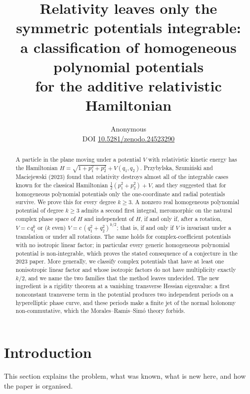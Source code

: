 \documentclass[11pt]{article}
\title{Relativity leaves only the symmetric potentials integrable:\\
a classification of homogeneous polynomial potentials\\
for the additive relativistic Hamiltonian}
\author{Anonymous\\[3pt]{\small DOI \href{https://doi.org/10.5281/zenodo.24523290}{10.5281/zenodo.24523290}}}
\date{}
\numberwithin{equation}{section}
\theoremstyle{definition}
\theoremstyle{remark}
\begin{document}
\maketitle

\begin{abstract}
A particle in the plane moving under a potential $V$ with relativistic kinetic energy has the Hamiltonian
$H=\sqrt{1+p_1^2+p_2^2}+V(q_1,q_2)$. Przybylska, Szumi\'nski and Maciejewski (2023) found that relativity destroys
almost all of the integrable cases known for the classical Hamiltonian $\tfrac12(p_1^2+p_2^2)+V$, and they
suggested that for homogeneous polynomial potentials only the one-coordinate and radial potentials survive.
We prove this for every degree $k\ge3$. A nonzero real homogeneous polynomial potential of degree $k\ge3$ admits a
second first integral, meromorphic on the natural complex phase space of $H$ and independent of $H$, if and only if,
after a rotation, $V=c\,q_1^k$ or ($k$ even) $V=c\,(q_1^2+q_2^2)^{k/2}$; that is, if and only if $V$ is invariant
under a translation or under all rotations. The same holds for complex-coefficient potentials with no isotropic
linear factor; in particular every generic homogeneous polynomial potential is non-integrable, which proves the stated consequence of a conjecture in the 2023 paper. More generally, we classify complex potentials that have at least one nonisotropic linear factor and whose isotropic factors do not have multiplicity exactly $k/2$, and we name the two families that the method leaves undecided. The new ingredient is a
rigidity theorem at a vanishing transverse Hessian eigenvalue: a first nonconstant transverse term in the potential
produces two independent periods on a hyperelliptic phase curve, and these periods make a finite jet of the normal
holonomy non-commutative, which the Morales--Ramis--Sim\'o theory forbids.
\end{abstract}

\section{Introduction}\label{sec:intro}

This section explains the problem, what was known, what is new here, and how the paper is organised.
\end{document}
